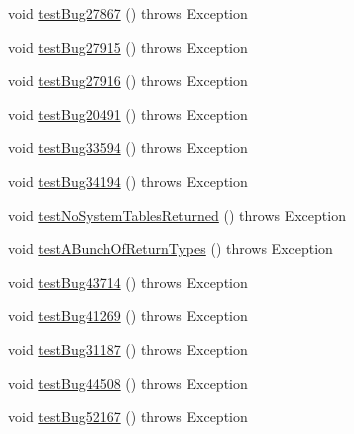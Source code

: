 \begin{DoxyCompactItemize}
\item 
void \mbox{\hyperlink{classtestsuite_1_1regression_1_1_meta_data_regression_test_ad4bf6071c2581485e1d8d44e36d385ae}{test\+Bug27867}} ()  throws Exception 
\item 
void \mbox{\hyperlink{classtestsuite_1_1regression_1_1_meta_data_regression_test_a32361bc11ddd1b2990adfa15697e27ae}{test\+Bug27915}} ()  throws Exception 
\item 
void \mbox{\hyperlink{classtestsuite_1_1regression_1_1_meta_data_regression_test_a360ac39f54be19d70c9d43f584bc6f0f}{test\+Bug27916}} ()  throws Exception 
\item 
void \mbox{\hyperlink{classtestsuite_1_1regression_1_1_meta_data_regression_test_abb3327e750cc332fa6f7a293572b16e1}{test\+Bug20491}} ()  throws Exception 
\item 
void \mbox{\hyperlink{classtestsuite_1_1regression_1_1_meta_data_regression_test_adb0cee1c23451feae0c5ee851ee0d5ba}{test\+Bug33594}} ()  throws Exception 
\item 
void \mbox{\hyperlink{classtestsuite_1_1regression_1_1_meta_data_regression_test_ac79bd5bb01b78e780d95f5d0fb285541}{test\+Bug34194}} ()  throws Exception 
\item 
void \mbox{\hyperlink{classtestsuite_1_1regression_1_1_meta_data_regression_test_a25affb2779e50388dbed36b52de4f1ea}{test\+No\+System\+Tables\+Returned}} ()  throws Exception 
\item 
void \mbox{\hyperlink{classtestsuite_1_1regression_1_1_meta_data_regression_test_a502252e326916cd0924cd5304e805840}{test\+A\+Bunch\+Of\+Return\+Types}} ()  throws Exception 
\item 
void \mbox{\hyperlink{classtestsuite_1_1regression_1_1_meta_data_regression_test_ab951e6884bbb864b56804cdbb096b57d}{test\+Bug43714}} ()  throws Exception 
\item 
void \mbox{\hyperlink{classtestsuite_1_1regression_1_1_meta_data_regression_test_a797ade6bff170eaf2551f5731a3dd7ef}{test\+Bug41269}} ()  throws Exception 
\item 
void \mbox{\hyperlink{classtestsuite_1_1regression_1_1_meta_data_regression_test_ae11afffc667500d79aec8b585ccd51a5}{test\+Bug31187}} ()  throws Exception 
\item 
void \mbox{\hyperlink{classtestsuite_1_1regression_1_1_meta_data_regression_test_ad93bb1dae18b4d8f194c7ba8a4d6b09d}{test\+Bug44508}} ()  throws Exception 
\item 
void \mbox{\hyperlink{classtestsuite_1_1regression_1_1_meta_data_regression_test_a9fe48a9548719aa95df0a85252333e6c}{test\+Bug52167}} ()  throws Exception 

\end{DoxyCompactItemize}
